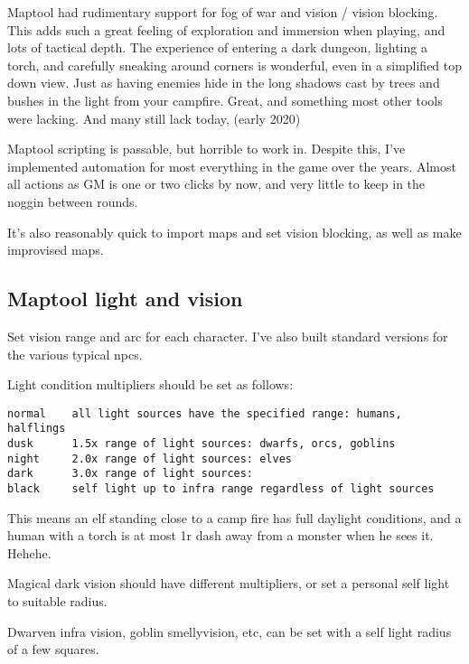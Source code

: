 Maptool had rudimentary support for fog of war and vision / vision blocking. This adds such a great feeling of exploration and immersion when playing, and lots of tactical depth. The experience of entering a dark dungeon, lighting a torch, and carefully sneaking around corners is wonderful, even in a simplified top down view. Just as having enemies hide in the long shadows cast by trees and bushes in the light from your campfire. Great, and something most other tools were lacking. And many still lack today, \vvsmall(early 2020)\normalsize

Maptool scripting is passable, but horrible to work in. Despite this, I've implemented automation for most everything in the game over the years. Almost all actions as GM is one or two clicks by now, and very little to keep in the noggin between rounds.

It's also reasonably quick to import maps and set vision blocking, as well as make improvised maps.


\subsection*{Maptool light and vision}
Set vision range and arc for each character. I've also built standard versions for the various typical npcs.

Light condition multipliers should be set as follows:
\small\begin{verbatim}
normal    all light sources have the specified range: humans, halflings
dusk      1.5x range of light sources: dwarfs, orcs, goblins
night     2.0x range of light sources: elves
dark      3.0x range of light sources:
black     self light up to infra range regardless of light sources
\end{verbatim}\normalsize

This means an elf standing close to a camp fire has full daylight conditions, and a human with a torch is at most 1r dash away from a monster when he sees it. Hehehe.

Magical dark vision should have different multipliers, or set a personal self light to suitable radius.

Dwarven infra vision, goblin smellyvision, etc, can be set with a self light radius of a few squares.







